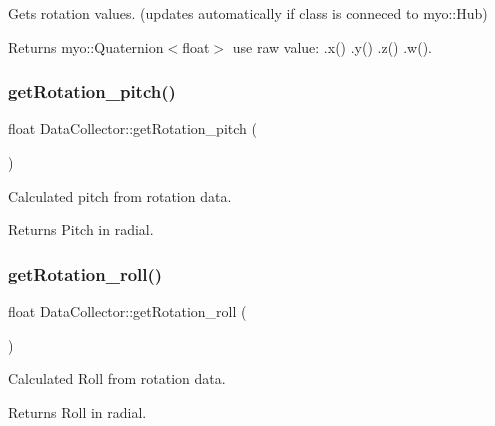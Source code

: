 Gets rotation values. (updates automatically if class is conneced to myo\+::\+Hub) 

\begin{DoxyReturn}{Returns}
myo\+::\+Quaternion$<$float$>$ use raw value\+: .x() .y() .z() .w(). 
\end{DoxyReturn}
\mbox{\label{class_data_collector_a603dbbfb9d59838c775f51e1e695e638}} 
\subsubsection{\texorpdfstring{get\+Rotation\+\_\+pitch()}{getRotation\_pitch()}}
{\footnotesize\ttfamily float Data\+Collector\+::get\+Rotation\+\_\+pitch (\begin{DoxyParamCaption}{ }\end{DoxyParamCaption})\hspace{0.3cm}{\ttfamily [inline]}}



Calculated pitch from rotation data. 

\begin{DoxyReturn}{Returns}
Pitch in radial. 
\end{DoxyReturn}
\mbox{\label{class_data_collector_a4e761ba292f93b5ac18e05a860a697ab}} 
\subsubsection{\texorpdfstring{get\+Rotation\+\_\+roll()}{getRotation\_roll()}}
{\footnotesize\ttfamily float Data\+Collector\+::get\+Rotation\+\_\+roll (\begin{DoxyParamCaption}{ }\end{DoxyParamCaption})\hspace{0.3cm}{\ttfamily [inline]}}



Calculated Roll from rotation data. 

\begin{DoxyReturn}{Returns}
Roll in radial. 
\end{DoxyReturn}
\mbox{\label{class_data_collector_a45175c5352dd3870c2d1cf99c4b2d938}} 
